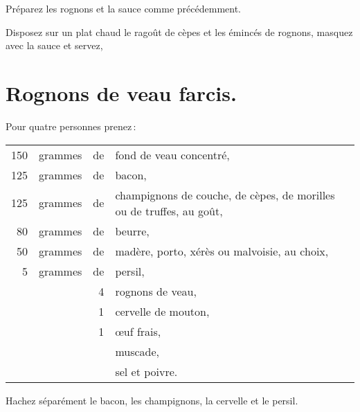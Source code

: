 Préparez les rognons et la sauce comme précédemment.

Disposez sur un plat chaud le ragoût de cèpes et les émincés de rognons,
masquez avec la sauce et servez,

\section*{\centering Rognons de veau farcis.}
{}

Pour quatre personnes prenez :

\medskip

\footnotesize
\begin{longtable}{rrrp{18em}}
    150 & grammes & de & fond de veau concentré,                                                          \\
    125 & grammes & de & bacon,                                                                           \\
    125 & grammes & de & champignons de couche, de cèpes, de morilles ou de truffes, au goût,             \\
     80 & grammes & de & beurre,                                                                          \\
     50 & grammes & de & madère, porto, xérès ou malvoisie, au choix,                                     \\
      5 & grammes & de & persil,                                                                          \\
        &         &  4 & rognons de veau,                                                                 \\
        &         &  1 & cervelle de mouton,                                                              \\
        &         &  1 & œuf frais,                                                                       \\
        &         &    & muscade,                                                                         \\
        &         &    & sel et poivre.                                                                   \\
\end{longtable}
\normalsize

Hachez séparément le bacon, les champignons, la cervelle et le persil.

